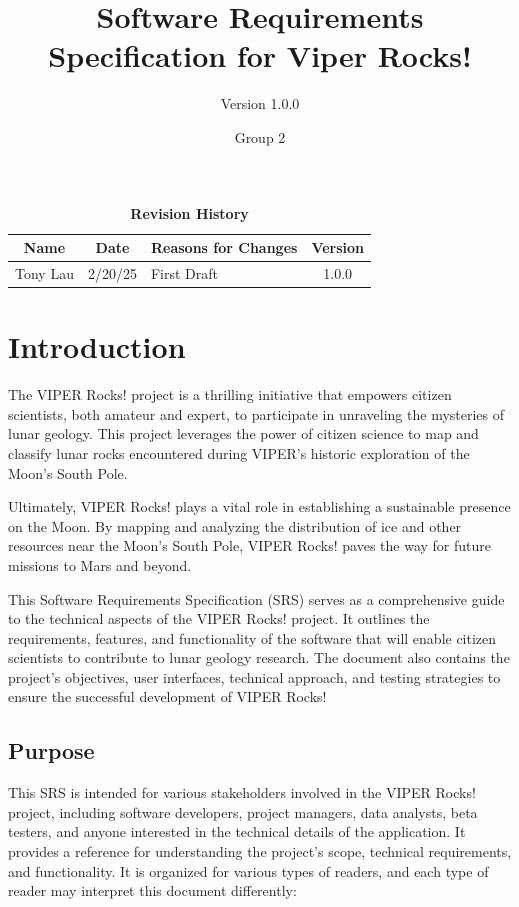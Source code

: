 \documentclass{article}
\begin{document}
\title{Software Requirements Specification for Viper Rocks!}
\author{Version 1.0.0}
\date{Group 2}

\maketitle
\tableofcontents
\newpage

\fancyhf{}
\fancyfoot[C]{\thepage}

\begin{table}[h!]
\centering
\caption{\textbf{Revision History}}
\begin{tabularx}{\textwidth}{|c|c|X|c|}
\hline
\textbf{Name} & \textbf{Date} & \textbf{Reasons for Changes} & \textbf{Version} \\
\hline
Tony Lau & 2/20/25 & First Draft & 1.0.0 \\
\hline

\hline

\hline

\hline
\end{tabularx}
\end{table}

\section{Introduction}
The VIPER Rocks! project is a thrilling initiative that empowers citizen scientists, both amateur and expert, to participate in unraveling the mysteries of lunar geology. This project leverages the power of citizen science to map and classify lunar rocks encountered during VIPER's historic exploration of the Moon's South Pole.

Ultimately, VIPER Rocks! plays a vital role in establishing a sustainable presence on the Moon. By mapping and analyzing the distribution of ice and other resources near the Moon's South Pole, VIPER Rocks! paves the way for future missions to Mars and beyond.

This Software Requirements Specification (SRS) serves as a comprehensive guide to the technical aspects of the VIPER Rocks! project. It outlines the requirements, features, and functionality of the software that will enable citizen scientists to contribute to lunar geology research. The document also contains the project's objectives, user interfaces, technical approach, and testing strategies to ensure the successful development of VIPER Rocks!

\subsection{Purpose}
This SRS is intended for various stakeholders involved in the VIPER Rocks! project, including software developers, project managers, data analysts, beta testers, and anyone interested in the technical details of the application. It provides a reference for understanding the project's scope, technical requirements, and functionality. It is organized for various types of readers, and each type of reader may interpret this document differently:
\end{document}
